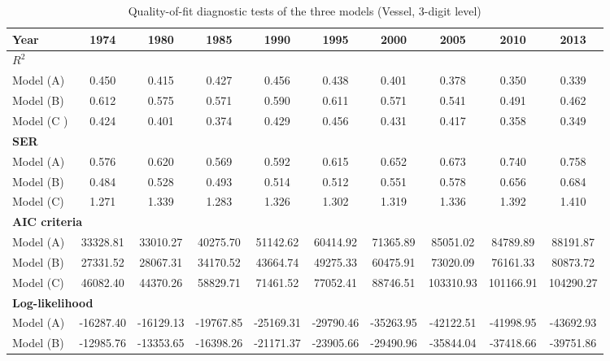 \documentclass[11pt,twoside, authoryear]{elsarticle}
\begin{document}
\begin{landscape}
\begin{table}[htbp]
  \centering
  \footnotesize{
  \caption{Quality-of-fit diagnostic tests of the three models (Vessel, 3-digit level)}
    \label{tab:3models_diagnosis_vessel}%
   \begin{tabular}{l|c c c c c c c c c}
    \hline \hline
    \textbf{Year} & \multicolumn{1}{c}{\textbf{1974}} & \multicolumn{1}{c}{\textbf{1980}} & \multicolumn{1}{c}{\textbf{1985}} & \multicolumn{1}{c}{\textbf{1990}} & \multicolumn{1}{c}{\textbf{1995}} & \multicolumn{1}{c}{\textbf{2000}} & \multicolumn{1}{c}{\textbf{2005}} & \multicolumn{1}{c}{\textbf{2010}} & \multicolumn{1}{c}{\textbf{2013}} \\ \hline
    \multicolumn{10}{l}{\textbf{$R^2$}} \\ \hline
    Model (A) & 0.450 & 0.415 & 0.427 & 0.456 & 0.438 & 0.401 & 0.378 & 0.350 & 0.339 \\
    Model (B) & 0.612 & 0.575 & 0.571 & 0.590 & 0.611 & 0.571 & 0.541 & 0.491 & 0.462 \\
    Model (C ) & 0.424 & 0.401 & 0.374 & 0.429 & 0.456 & 0.431 & 0.417 & 0.358 & 0.349 \\ \hline
    \multicolumn{10}{l}{\textbf{SER} } \\ \hline
    Model (A) & 0.576 & 0.620 & 0.569 & 0.592 & 0.615 & 0.652 & 0.673 & 0.740 & 0.758 \\
    Model (B) & 0.484 & 0.528 & 0.493 & 0.514 & 0.512 & 0.551 & 0.578 & 0.656 & 0.684 \\
    Model (C) & 1.271 & 1.339 & 1.283 & 1.326 & 1.302 & 1.319 & 1.336 & 1.392 & 1.410 \\ \hline
    \multicolumn{10}{l}{\textbf{AIC criteria} } \\ \hline
    Model (A) & 33328.81 & 33010.27 & 40275.70 & 51142.62 & 60414.92 & 71365.89 & 85051.02 & 84789.89 & 88191.87 \\
    Model (B) & 27331.52 & 28067.31 & 34170.52 & 43664.74 & 49275.33 & 60475.91 & 73020.09 & 76161.33 & 80873.72 \\
    Model (C) & 46082.40 & 44370.26 & 58829.71 & 71461.52 & 77052.41 & 88746.51 & 103310.93 & 101166.91 & 104290.27 \\ \hline
    \multicolumn{10}{l}{\textbf{Log-likelihood}}\\ \hline
    Model (A) & -16287.40 & -16129.13 & -19767.85 & -25169.31 & -29790.46 & -35263.95 & -42122.51 & -41998.95 & -43692.93 \\
    Model (B) & -12985.76 & -13353.65 & -16398.26 & -21171.37 & -23905.66 & -29490.96 & -35844.04 & -37418.66 & -39751.86 \\

\end{tabular}}
\end{table}
\end{landscape}
\end{document}

